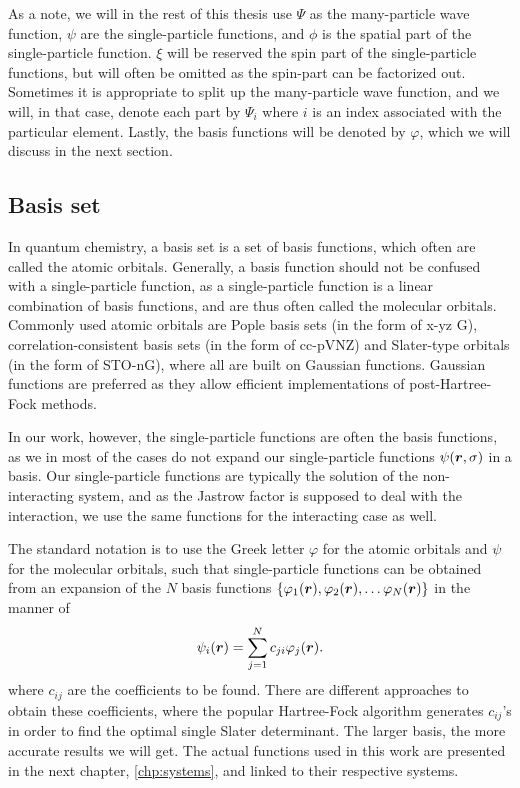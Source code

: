 As a note, we will in the rest of this thesis use $\Psi$ as the many-particle wave function, $\psi$ are the single-particle functions, and $\phi$ is the spatial part of the single-particle function. $\xi$ will be reserved the spin part of the single-particle functions, but will often be omitted as the spin-part can be factorized out. Sometimes it is appropriate to split up the many-particle wave function, and we will, in that case, denote each part by $\Psi_i$ where $i$ is an index associated with the particular element. Lastly, the basis functions will be denoted by $\varphi$, which we will discuss in the next section. 

\subsection{Basis set} \label{sec:basisset}
In quantum chemistry, a basis set is a set of basis functions, which often are called the atomic orbitals.  Generally, a basis function should not be confused with a single-particle function, as a single-particle function is a linear combination of basis functions, and are thus often called the molecular orbitals. Commonly used atomic orbitals are Pople basis sets (in the form of x-yz G), correlation-consistent basis sets (in the form of cc-pVNZ) and Slater-type orbitals (in the form of STO-nG), where all are built on Gaussian functions. Gaussian functions are preferred as they allow efficient implementations of post-Hartree-Fock methods.

In our work, however, the single-particle functions are often the basis functions, as we in most of the cases do not expand our single-particle functions $\psi(\boldsymbol{{r}},\sigma)$ in a basis. Our single-particle functions are typically the solution of the non-interacting system, and as the Jastrow factor is supposed to deal with the interaction, we use the same functions for the interacting case as well.

The standard notation is to use the Greek letter $\varphi$ for the atomic orbitals and $\psi$ for the molecular orbitals, such that single-particle functions can be obtained from an expansion of the $N$ basis functions $\{\varphi_1(\boldsymbol{{r}}),\varphi_2(\boldsymbol{{r}}),\hdots\varphi_N(\boldsymbol{{r}})\}$ in the manner of
\begin{equation}
\psi_i(\boldsymbol{{r}})=\sum_{j=1}^Nc_{ji}\varphi_j(\boldsymbol{{r}}).
\end{equation}
where $c_{ij}$ are the coefficients to be found. There are different approaches to obtain these coefficients, where the popular Hartree-Fock algorithm generates $c_{ij}$'s in order to find the optimal single Slater determinant. The larger basis, the more accurate results we will get. The actual functions used in this work are presented in the next chapter, \ref{chp:systems}, and linked to their respective systems. 

